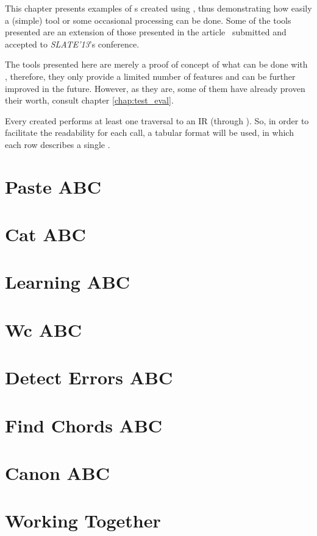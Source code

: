 This chapter presents examples of \abcpt{}s created using \abcdt{}, thus demonstrating how easily a
(simple) tool or some occasional processing can be done. Some of the tools presented are an
extension of those presented in the article~\cite{Azevedo2013} submitted and accepted to
\emph{SLATE'13}'s conference.

The tools presented here are merely a proof of concept of what can be done with \abcdt{}, therefore,
they only provide a limited number of features and can be further improved in the future. However,
as they are, some of them have already proven their worth, consult chapter
\ref{chap:test_eval}.

Every \abcpt{} created performs at least one traversal to an \abc{} \ac{IR} (through \dt{}). So, in
order to facilitate the \abcdtrules{} readability for each \dt{} call, a tabular format will be
used, in which each row describes a single \abcdtrule{}.


\section{Paste ABC}


\section{Cat ABC}


\section{Learning ABC}


\section{Wc ABC}


\section{Detect Errors ABC}


\section{Find Chords ABC}


\section{Canon ABC}


\section{Working Together}

